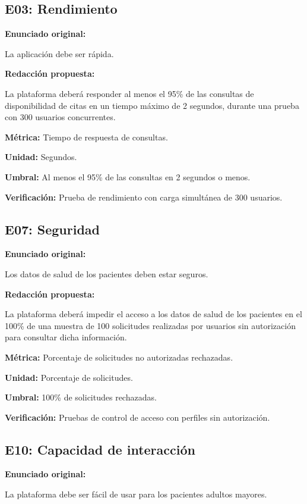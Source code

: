 \documentclass[12pt,a4paper]{article}
\begin{document}
\subsection{E03: Rendimiento}

\textbf{Enunciado original:}

La aplicación debe ser rápida.

\textbf{Redacción propuesta:}

La plataforma deberá responder al menos
el 95\% de las consultas de disponibilidad
de citas en un tiempo máximo de
2 segundos, durante una prueba
con 300 usuarios concurrentes.

\textbf{Métrica:}
Tiempo de respuesta de consultas.

\textbf{Unidad:}
Segundos.

\textbf{Umbral:}
Al menos el 95\% de las consultas
en 2 segundos o menos.

\textbf{Verificación:}
Prueba de rendimiento con carga
simultánea de 300 usuarios.

\subsection{E07: Seguridad}

\textbf{Enunciado original:}

Los datos de salud de los pacientes
deben estar seguros.

\textbf{Redacción propuesta:}

La plataforma deberá impedir el acceso
a los datos de salud de los pacientes
en el 100\% de una muestra de
100 solicitudes realizadas por usuarios
sin autorización para consultar
dicha información.

\textbf{Métrica:}
Porcentaje de solicitudes no
autorizadas rechazadas.

\textbf{Unidad:}
Porcentaje de solicitudes.

\textbf{Umbral:}
100\% de solicitudes rechazadas.

\textbf{Verificación:}
Pruebas de control de acceso
con perfiles sin autorización.

\subsection{E10: Capacidad de interacción}

\textbf{Enunciado original:}

La plataforma debe ser fácil de usar
para los pacientes adultos mayores.
\end{document}
